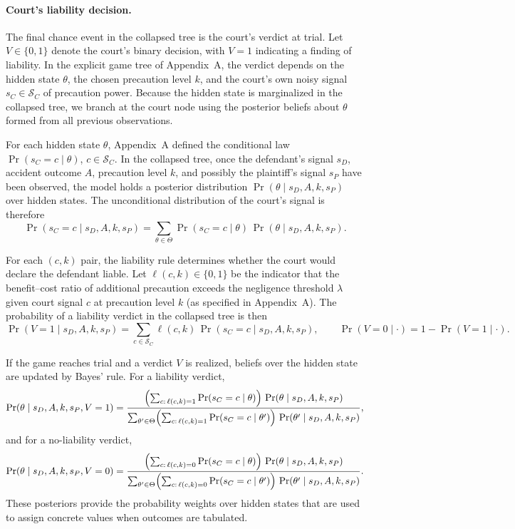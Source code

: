 \documentclass{article}
\begin{document}
\paragraph{Court’s liability decision.} The final chance event in the collapsed tree is the court’s verdict at trial. Let $V\in\{0,1\}$ denote the court’s binary decision, with $V=1$ indicating a finding of liability. In the explicit game tree of Appendix~A, the verdict depends on the hidden state $\theta$, the chosen precaution level $k$, and the court’s own noisy signal $s_C\in\mathcal{S}_C$ of precaution power. Because the hidden state is marginalized in the collapsed tree, we branch at the court node using the posterior beliefs about $\theta$ formed from all previous observations.

For each hidden state $\theta$, Appendix~A defined the conditional law $\Pr(s_C=c\mid \theta)$, $c\in\mathcal{S}_C$. In the collapsed tree, once the defendant’s signal $s_D$, accident outcome $A$, precaution level $k$, and possibly the plaintiff’s signal $s_P$ have been observed, the model holds a posterior distribution $\Pr(\theta \mid s_D, A, k, s_P)$ over hidden states. The unconditional distribution of the court’s signal is therefore
\[
\Pr(s_C=c \mid s_D, A, k, s_P)
= \sum_{\theta\in\Theta} \Pr(s_C=c\mid \theta)\,\Pr(\theta \mid s_D, A, k, s_P).
\]

For each $(c,k)$ pair, the liability rule determines whether the court would declare the defendant liable. Let $\ell(c,k)\in\{0,1\}$ be the indicator that the benefit–cost ratio of additional precaution exceeds the negligence threshold $\lambda$ given court signal $c$ at precaution level $k$ (as specified in Appendix~A). The probability of a liability verdict in the collapsed tree is then
\[
\Pr(V=1 \mid s_D, A, k, s_P)
= \sum_{c\in\mathcal{S}_C} \ell(c,k)\,
   \Pr(s_C=c \mid s_D, A, k, s_P),
\qquad
\Pr(V=0 \mid \cdot)=1-\Pr(V=1 \mid \cdot).
\]

If the game reaches trial and a verdict $V$ is realized, beliefs over the hidden state are updated by Bayes’ rule. For a liability verdict,
\[
\Pr(\theta \mid s_D, A, k, s_P, V=1)
= \frac{\Bigl(\sum_{c:\,\ell(c,k)=1}\Pr(s_C=c\mid \theta)\Bigr)\,
       \Pr(\theta \mid s_D, A, k, s_P)}
       {\sum_{\theta'\in\Theta}\Bigl(\sum_{c:\,\ell(c,k)=1}\Pr(s_C=c\mid \theta')\Bigr)\,
        \Pr(\theta' \mid s_D, A, k, s_P)},
\]
and for a no-liability verdict,
\[
\Pr(\theta \mid s_D, A, k, s_P, V=0)
= \frac{\Bigl(\sum_{c:\,\ell(c,k)=0}\Pr(s_C=c\mid \theta)\Bigr)\,
       \Pr(\theta \mid s_D, A, k, s_P)}
       {\sum_{\theta'\in\Theta}\Bigl(\sum_{c:\,\ell(c,k)=0}\Pr(s_C=c\mid \theta')\Bigr)\,
        \Pr(\theta' \mid s_D, A, k, s_P)}.
\]
These posteriors provide the probability weights over hidden states that are used to assign concrete values when outcomes are tabulated.
\end{document}
